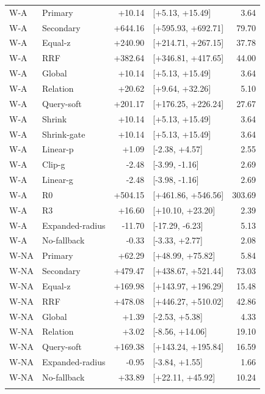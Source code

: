 \begin{table}[htbp]
\begin{tabular}{llrlr}
W-A & Primary & +10.14 & [+5.13, +15.49] & 3.64\\
W-A & Secondary & +644.16 & [+595.93, +692.71] & 79.70\\
W-A & Equal-z & +240.90 & [+214.71, +267.15] & 37.78\\
W-A & RRF & +382.64 & [+346.81, +417.65] & 44.00\\
W-A & Global & +10.14 & [+5.13, +15.49] & 3.64\\
W-A & Relation & +20.62 & [+9.64, +32.26] & 5.10\\
W-A & Query-soft & +201.17 & [+176.25, +226.24] & 27.67\\
W-A & Shrink & +10.14 & [+5.13, +15.49] & 3.64\\
W-A & Shrink-gate & +10.14 & [+5.13, +15.49] & 3.64\\
W-A & Linear-p & +1.09 & [-2.38, +4.57] & 2.55\\
W-A & Clip-g & -2.48 & [-3.99, -1.16] & 2.69\\
W-A & Linear-g & -2.48 & [-3.98, -1.16] & 2.69\\
W-A & R0 & +504.15 & [+461.86, +546.56] & 303.69\\
W-A & R3 & +16.60 & [+10.10, +23.20] & 2.39\\
W-A & Expanded-radius & -11.70 & [-17.29, -6.23] & 5.13\\
W-A & No-fallback & -0.33 & [-3.33, +2.77] & 2.08\\
\addlinespace
W-NA & Primary & +62.29 & [+48.99, +75.82] & 5.84\\
W-NA & Secondary & +479.47 & [+438.67, +521.44] & 73.03\\
W-NA & Equal-z & +169.98 & [+143.97, +196.29] & 15.48\\
W-NA & RRF & +478.08 & [+446.27, +510.02] & 42.86\\
W-NA & Global & +1.39 & [-2.53, +5.38] & 4.33\\
W-NA & Relation & +3.02 & [-8.56, +14.06] & 19.10\\
W-NA & Query-soft & +169.38 & [+143.24, +195.84] & 16.59\\
W-NA & Expanded-radius & -0.95 & [-3.84, +1.55] & 1.66\\
W-NA & No-fallback & +33.89 & [+22.11, +45.92] & 10.24\\
\addlinespace
\bottomrule
\end{tabular}
\end{table}

